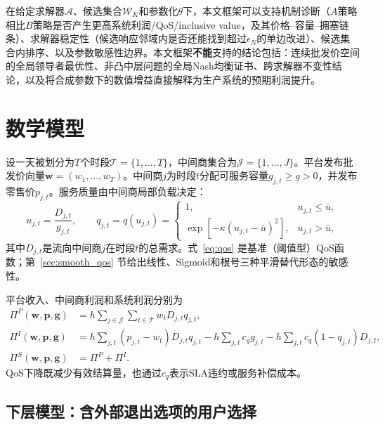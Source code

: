 \documentclass[UTF8,11pt]{ctexart}
\newcommand{\qos}{q}
\newcommand{\T}{\mathcal{T}}
\newcommand{\J}{\mathcal{J}}
\newcommand{\D}{D}
\newcommand{\w}{\boldsymbol{w}}
\newcommand{\p}{\boldsymbol{p}}
\newcommand{\g}{\boldsymbol{g}}
\begin{document}
在给定求解器$\mathcal{A}$、候选集合$\mathcal{W}_K$和参数化$\theta$下，本文框架可以支持机制诊断（$A$策略相比$B$策略是否产生更高系统利润/QoS/inclusive value，及其价格--容量--拥塞链条）、求解器稳定性（候选响应邻域内是否还能找到超过$\epsilon_N$的单边改进）、候选集合内排序、以及参数敏感性边界。本文框架\textbf{不能}支持的结论包括：连续批发价空间的全局领导者最优性、非凸中层问题的全局Nash均衡证书、跨求解器不变性结论，以及将合成参数下的数值增益直接解释为生产系统的预期利润提升。

\section{数学模型}
\label{sec:formulation}

设一天被划分为$T$个时段$\T=\{1,\ldots,T\}$，中间商集合为$\J=\{1,\ldots,J\}$。平台发布批发价向量$\w=(w_1,\ldots,w_T)$。中间商$j$为时段$t$分配可服务容量$g_{j,t}\ge \underline g>0$，并发布零售价$p_{j,t}$。服务质量由中间商局部负载决定：
\begin{equation}
  u_{j,t}=\frac{\D_{j,t}}{g_{j,t}},\qquad
  q_{j,t}=\qos(u_{j,t})=
  \begin{cases}
    1, & u_{j,t}\le \bar u,\\
    \exp[-\kappa(u_{j,t}-\bar u)^2], & u_{j,t}>\bar u,
  \end{cases}
  \label{eq:qos}
\end{equation}
其中$\D_{j,t}$是流向中间商$j$在时段$t$的总需求。式~\eqref{eq:qos} 是基准（阈值型）QoS函数；第~\ref{sec:smooth_qos} 节给出线性、Sigmoid和根号三种平滑替代形态的敏感性。

平台收入、中间商利润和系统利润分别为
\begin{align}
  \Pi^P(\w,\p,\g)
  &=h\sum_{j\in\J}\sum_{t\in\T} w_t\D_{j,t}q_{j,t}, \label{eq:platform_profit}\\
  \Pi^I(\w,\p,\g)
  &=h\sum_{j,t}(p_{j,t}-w_t)\D_{j,t}q_{j,t}
    -h\sum_{j,t}c_g g_{j,t}
    -h\sum_{j,t}c_q(1-q_{j,t})\D_{j,t}, \label{eq:intermediary_profit}\\
  \Pi^S(\w,\p,\g)&=\Pi^P+\Pi^I. \label{eq:system_profit}
\end{align}
QoS下降既减少有效结算量，也通过$c_q$表示SLA违约或服务补偿成本。

\subsection{下层模型：含外部退出选项的用户选择}
\label{sec:lower_user}
\end{document}
